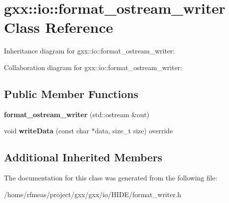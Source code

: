 \hypertarget{classgxx_1_1io_1_1format__ostream__writer}{}\section{gxx\+:\+:io\+:\+:format\+\_\+ostream\+\_\+writer Class Reference}
\label{classgxx_1_1io_1_1format__ostream__writer}


Inheritance diagram for gxx\+:\+:io\+:\+:format\+\_\+ostream\+\_\+writer\+:


Collaboration diagram for gxx\+:\+:io\+:\+:format\+\_\+ostream\+\_\+writer\+:
\subsection*{Public Member Functions}
\begin{DoxyCompactItemize}
\item 
{\bfseries format\+\_\+ostream\+\_\+writer} (std\+::ostream \&out)\hypertarget{classgxx_1_1io_1_1format__ostream__writer_ac5100bd5712f71301506b1cfc3b4a36e}{}\label{classgxx_1_1io_1_1format__ostream__writer_ac5100bd5712f71301506b1cfc3b4a36e}

\item 
void {\bfseries write\+Data} (const char $\ast$data, size\+\_\+t size) override\hypertarget{classgxx_1_1io_1_1format__ostream__writer_a7cb7009b2a7c6ab2e9e45f28b1262dec}{}\label{classgxx_1_1io_1_1format__ostream__writer_a7cb7009b2a7c6ab2e9e45f28b1262dec}

\end{DoxyCompactItemize}
\subsection*{Additional Inherited Members}


The documentation for this class was generated from the following file\+:\begin{DoxyCompactItemize}
\item 
/home/rfmeas/project/gxx/gxx/io/\+H\+I\+D\+E/format\+\_\+writer.\+h\end{DoxyCompactItemize}
